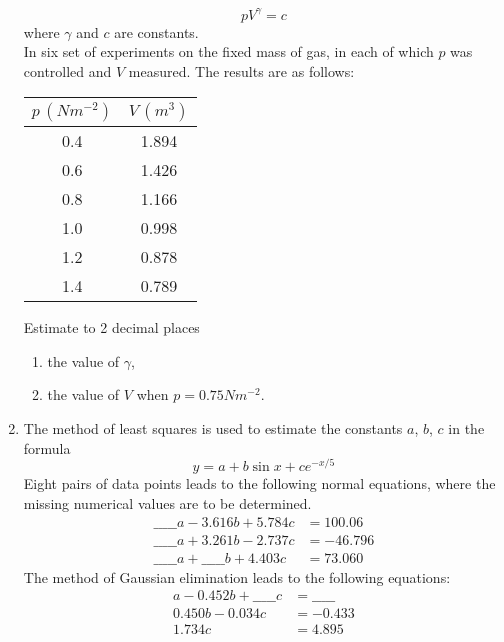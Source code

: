 \documentclass[12pt,class=book,crop=false]{standalone}
\begin{document}
\begin{enumerate}
	      \[
		      pV^\gamma=c
	      \]
	      where $ \gamma $ and $ c $ are constants.\\
	      In six set of experiments on the fixed mass of gas, in each of which $ p $ was controlled and $ V $ measured. The results are as follows:
	      \begin{table}[H]
		      \centering
		      \begin{tabular}{cc}
			      \toprule
			      $ p\,(Nm^{-2}) $ &
				  $ V\,(m^3) $     \\\midrule
				   0.4   & 
				   1.894 \\
				   0.6   &
				   1.426 \\
				    0.8   &
					1.166 \\
					 1.0   &
					 0.998 \\
					  1.2   &
					  0.878 \\
					   1.4   &
					    0.789 \\\bottomrule
		      \end{tabular}
	      \end{table}
	      Estimate to 2 decimal places
	      \begin{enumerate}[label=(\roman*)]
		      \item the value of $ \gamma $,
		      \item the value of $ V $ when $ p = 0.75 Nm^{-2} $.
	      \end{enumerate}
	\item The method of least squares is used to estimate the constants $ a $, $ b $, $ c $ in the formula
	      \[
		      y=a+b \sin x+ce^{-x/5}
	      \]
	      Eight pairs of data points leads to the following normal equations, where the missing numerical values are to be determined.
	      \begin{align*}
		      {\_\_\_\_\_}a  -  3.616 b  + 5.784 c       & =   100.06  \\
		      {\_\_\_\_\_}a +   3.261 b  -  2.737 c      & = - 46.796  \\
		      {\_\_\_\_\_}a  + {\_\_\_\_\_} b +  4.403 c & =    73.060
	      \end{align*}
	      The method of Gaussian elimination leads to the following equations:
	      \begin{align*}
		      a  -  0.452 b + {\_\_\_\_\_} c & = {\_\_\_\_\_} \\
		      0.450 b -  0.034 c             & =  -0.433      \\
		      1.734 c                        & =  4.895
	      \end{align*}

\end{enumerate}
\end{document}
